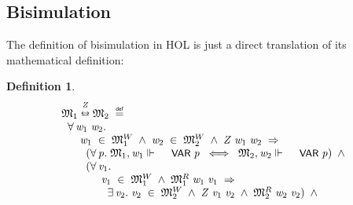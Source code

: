 \documentclass{llncs}
\newtheorem{defn}{Definition}[chapter]
\newenvironment{holmath}{\begin{displaymath}\begin{array}{l}}{\end{array}\end{displaymath}\ignorespacesafterend}
\renewcommand{\HOLConst}[1]{{\textsf{\upshape\small #1}}}
\begin{document}
\subsection{Bisimulation}
The definition of bisimulation in HOL is just a direct translation of its mathematical definition: 
\begin{defn}
{\upshape\cite[Definition 2.16 (Bisimulations)]{Blackburn}}
\begin{holmath}
  \HOLFreeVar{\ensuremath{\mathfrak{M}}}\sb{\mathrm{1}}\overset{\HOLFreeVar{Z}}\leftrightarroweq\HOLFreeVar{\ensuremath{\mathfrak{M}}}\sb{\mathrm{2}}\;\HOLTokenDefEquality{}\\
\;\;\HOLSymConst{\HOLTokenForall{}}\HOLBoundVar{w}\sb{\mathrm{1}}\;\HOLBoundVar{w}\sb{\mathrm{2}}.\\
\;\;\;\;\;\;\HOLBoundVar{w}\sb{\mathrm{1}}\;\HOLSymConst{\HOLTokenIn{}}\;\HOLFreeVar{\ensuremath{\mathfrak{M}}}\sb{\mathrm{1}}\HOLSymConst{\ensuremath{\sp{W}}}\;\HOLSymConst{\HOLTokenConj{}}\;\HOLBoundVar{w}\sb{\mathrm{2}}\;\HOLSymConst{\HOLTokenIn{}}\;\HOLFreeVar{\ensuremath{\mathfrak{M}}}\sb{\mathrm{2}}\HOLSymConst{\ensuremath{\sp{W}}}\;\HOLSymConst{\HOLTokenConj{}}\;\HOLFreeVar{Z}\;\HOLBoundVar{w}\sb{\mathrm{1}}\;\HOLBoundVar{w}\sb{\mathrm{2}}\;\HOLSymConst{\HOLTokenImp{}}\\
\;\;\;\;\;\;\;\;(\HOLSymConst{\HOLTokenForall{}}\HOLBoundVar{p}.\;\HOLFreeVar{\ensuremath{\mathfrak{M}}}\sb{\mathrm{1}},\HOLBoundVar{w}\sb{\mathrm{1}}\ensuremath{\Vdash}\;\HOLConst{VAR}\;\HOLBoundVar{p}\;\HOLSymConst{\HOLTokenEquiv{}}\;\HOLFreeVar{\ensuremath{\mathfrak{M}}}\sb{\mathrm{2}},\HOLBoundVar{w}\sb{\mathrm{2}}\ensuremath{\Vdash}\;\HOLConst{VAR}\;\HOLBoundVar{p})\;\HOLSymConst{\HOLTokenConj{}}\\
\;\;\;\;\;\;\;\;(\HOLSymConst{\HOLTokenForall{}}\HOLBoundVar{v}\sb{\mathrm{1}}.\\
\;\;\;\;\;\;\;\;\;\;\;\;\;\HOLBoundVar{v}\sb{\mathrm{1}}\;\HOLSymConst{\HOLTokenIn{}}\;\HOLFreeVar{\ensuremath{\mathfrak{M}}}\sb{\mathrm{1}}\HOLSymConst{\ensuremath{\sp{W}}}\;\HOLSymConst{\HOLTokenConj{}}\;\HOLFreeVar{\ensuremath{\mathfrak{M}}}\sb{\mathrm{1}}\HOLSymConst{\ensuremath{\sp{R}}}\;\HOLBoundVar{w}\sb{\mathrm{1}}\;\HOLBoundVar{v}\sb{\mathrm{1}}\;\HOLSymConst{\HOLTokenImp{}}\\
\;\;\;\;\;\;\;\;\;\;\;\;\;\;\;\HOLSymConst{\HOLTokenExists{}}\HOLBoundVar{v}\sb{\mathrm{2}}.\;\HOLBoundVar{v}\sb{\mathrm{2}}\;\HOLSymConst{\HOLTokenIn{}}\;\HOLFreeVar{\ensuremath{\mathfrak{M}}}\sb{\mathrm{2}}\HOLSymConst{\ensuremath{\sp{W}}}\;\HOLSymConst{\HOLTokenConj{}}\;\HOLFreeVar{Z}\;\HOLBoundVar{v}\sb{\mathrm{1}}\;\HOLBoundVar{v}\sb{\mathrm{2}}\;\HOLSymConst{\HOLTokenConj{}}\;\HOLFreeVar{\ensuremath{\mathfrak{M}}}\sb{\mathrm{2}}\HOLSymConst{\ensuremath{\sp{R}}}\;\HOLBoundVar{w}\sb{\mathrm{2}}\;\HOLBoundVar{v}\sb{\mathrm{2}})\;\HOLSymConst{\HOLTokenConj{}}\\

\end{holmath}
\end{defn}
\end{document}
